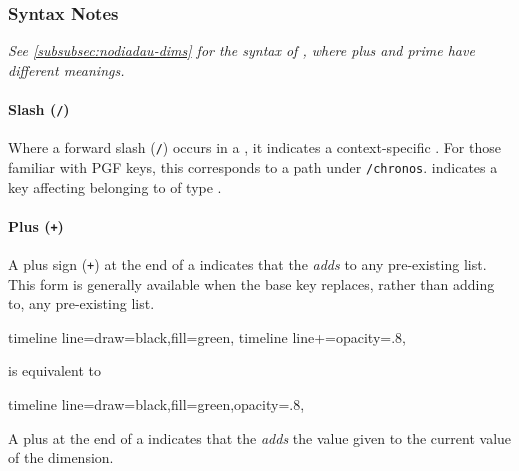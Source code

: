 \documentclass[10pt,british,a4paper]{ltxdoc}
\newcommand*\pgf{PGF}
\begin{document}

\subsubsection{Syntax Notes\label{subsubsec:nodiadau-syntax}}

\emph{See \cref{subsubsec:nodiadau-dims} for the syntax of \dimkeyslabelname{}, where plus and prime have different meanings.}

\paragraph{Slash (\texttt{/})\label{nod:slash}}
Where a forward slash (\texttt{/}) occurs in a \keylabelname{}, it indicates a context-specific \keylabelname{}.
For those familiar with \pgf{} keys, this corresponds to a path under \texttt{/chronos}.
 indicates a key affecting  belonging to \elementslabelname{} of type .

\paragraph{Plus (\texttt{+})\label{nod:plus}}
A plus sign (\texttt{+}) at the end of a \keylabelname{} indicates that the \keylabelname{} \emph{adds} to any pre-existing list.
This form is generally available when the base key replaces, rather than adding to, any pre-existing list.
\begin{chronoscode}
  timeline line={draw=black,fill=green},
  timeline line+={opacity=.8},
\end{chronoscode}
is equivalent to
\begin{chronoscode}
  timeline line={draw=black,fill=green,opacity=.8},
\end{chronoscode}
A plus at the end of a \dimkeylabelname{} indicates that the \dimkeylabelname{} \emph{adds} the value given to the current value of the dimension.
\end{document}
